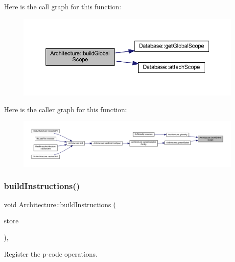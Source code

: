 Here is the call graph for this function\+:
\nopagebreak
\begin{figure}[H]
\begin{center}
\leavevmode
\includegraphics[width=350pt]{class_architecture_afa2d6a96b669efefe4b89915aa8a65f7_cgraph}
\end{center}
\end{figure}
Here is the caller graph for this function\+:
\nopagebreak
\begin{figure}[H]
\begin{center}
\leavevmode
\includegraphics[width=350pt]{class_architecture_afa2d6a96b669efefe4b89915aa8a65f7_icgraph}
\end{center}
\end{figure}
\mbox{\label{class_architecture_aa059c551a53018c8d70a1c2f9fc6ed73}} 
\subsubsection{\texorpdfstring{buildInstructions()}{buildInstructions()}}
{\footnotesize\ttfamily void Architecture\+::build\+Instructions (\begin{DoxyParamCaption}\item[{\mbox{\hyperlink{class_document_storage}{Document\+Storage}} \&}]{store }\end{DoxyParamCaption})\hspace{0.3cm}{\ttfamily [protected]}, {\ttfamily [virtual]}}



Register the p-\/code operations. 


